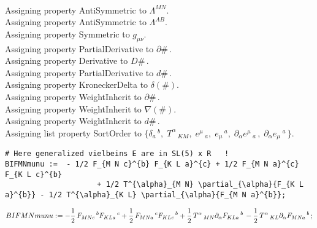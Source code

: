 \documentclass[11pt]{article}
\def\specialcolon{\mathrel{\mathop{:}}\hspace{-.5em}}
\begin{document}
\\
Assigning property AntiSymmetric to ${\Lambda}^{M N}$.
\\
Assigning property AntiSymmetric to ${\Lambda}^{A B}$.
\\
Assigning property Symmetric to ${g}_{\mu \nu}$.
\\
Assigning property PartialDerivative to $\partial{\#}\, $.
\\
Assigning property Derivative to $D{\#}\, $.
\\
Assigning property PartialDerivative to $d{\#}\, $.
\\
Assigning property KroneckerDelta to $\delta(\#)$.
\\
Assigning property WeightInherit to $\partial{\#}\, $.
\\
Assigning property WeightInherit to $\nabla(\#)$.
\\
Assigning property WeightInherit to $d{\#}\, $.
\\
Assigning list property SortOrder to $\{{\delta}_{a}\,^{b},\; {T}^{\alpha}\,_{K M},\; {e}^{\mu}\,_{a},\; {e}_{\mu}\,^{a},\; {\partial}_{\alpha}{{e}^{\mu}\,_{a}}\, ,\; {\partial}_{\alpha}{{e}_{\mu}\,^{a}}\, \}$.
\\
{\color[named]{Blue}\begin{verbatim}
# Here generalized vielbeins E are in SL(5) x R   !
BIFMNmunu :=  - 1/2 F_{M N c}^{b} F_{K L a}^{c} + 1/2 F_{M N a}^{c} F_{K L c}^{b} 
                     + 1/2 T^{\alpha}_{M N} \partial_{\alpha}{F_{K L a}^{b}} - 1/2 T^{\alpha}_{K L} \partial_{\alpha}{F_{M N a}^{b}};
\end{verbatim}}
\begin{dmath*}[compact, spread=2pt]
BIFMNmunu\specialcolon{}=  - \frac{1}{2}\, {F}_{M N c}\,^{b} {F}_{K L a}\,^{c} + \frac{1}{2}\, {F}_{M N a}\,^{c} {F}_{K L c}\,^{b} + \frac{1}{2}\, {T}^{\alpha}\,_{M N} {\partial}_{\alpha}{{F}_{K L a}\,^{b}}\,  - \frac{1}{2}\, {T}^{\alpha}\,_{K L} {\partial}_{\alpha}{{F}_{M N a}\,^{b}}\, ;
\end{dmath*}
\end{document}
